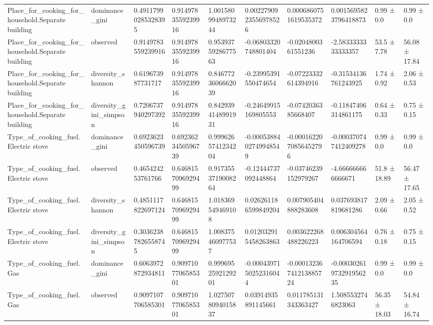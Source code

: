 \begin{longtable}{llllllllll}
Place\_for\_cooking\_for\_household.Separate building & dominance\_gini & 0.49117990285328395 & 0.9149783559239916 & 1.0015809948973244 & 0.0022790923556978526 & 0.0006860751619535372 & 0.0015695823796418873 & 0.99 ± 0.0 & 0.99 ± 0.0 \\
Place\_for\_cooking\_for\_household.Separate building & observed & 0.9149783559239916 & 0.9149783559239916 & 0.9539375928677563 & -0.06803320748801404 & -0.0204800361551236 & -2.5833333333333357 & 53.5 ± 7.78 & 56.08 ± 17.84 \\
Place\_for\_cooking\_for\_household.Separate building & diversity\_shannon & 0.619673987731717 & 0.9149783559239916 & 0.8467723606662039 & -0.23995391550474654 & -0.07223332614394916 & -0.31534136761243925 & 1.74 ± 0.92 & 2.06 ± 0.53 \\
Place\_for\_cooking\_for\_household.Separate building & diversity\_gini\_simpson & 0.7206737940297392 & 0.9149783559239916 & 0.8429394148991931 & -0.24649915169805553 & -0.0742036385668407 & -0.11847406314861175 & 0.64 ± 0.33 & 0.75 ± 0.15 \\
Type\_of\_cooking\_fuel.Electric stove & dominance\_gini & 0.6923623450596739 & 0.6923623450596739 & 0.9996265741234204 & -0.0005388402749948549 & -0.0001622070856452796 & -0.000370747412409278 & 0.99 ± 0.0 & 0.99 ± 0.0 \\
Type\_of\_cooking\_fuel.Electric stove & observed & 0.465424253761766 & 0.6468157096929499 & 0.9173553719008264 & -0.12444737092448864 & -0.03746239152979267 & -4.666666666666671 & 51.8 ± 18.89 & 56.47 ± 17.65 \\
Type\_of\_cooking\_fuel.Electric stove & diversity\_shannon & 0.4851117822697124 & 0.6468157096929499 & 1.018369549469108 & 0.026261186599849204 & 0.007905404888283608 & 0.037693817819681286 & 2.09 ± 0.66 & 2.05 ± 0.52 \\
Type\_of\_cooking\_fuel.Electric stove & diversity\_gini\_simpson & 0.30362387826558745 & 0.6468157096929499 & 1.008375460977537 & 0.012032915458263863 & 0.003622268488226223 & 0.006304564164706594 & 0.76 ± 0.18 & 0.75 ± 0.15 \\
Type\_of\_cooking\_fuel.Gas & dominance\_gini & 0.6063972872934811 & 0.9097107706585301 & 0.9996952592129201 & -0.0004397150252316044 & -0.00013236741213885724 & -0.00030261973291956235 & 0.99 ± 0.0 & 0.99 ± 0.0 \\
Type\_of\_cooking\_fuel.Gas & observed & 0.9097107706585301 & 0.9097107706585301 & 1.0275078094015837 & 0.03914935891145661 & 0.011785131343363427 & 1.5085532746823063 & 56.35 ± 18.03 & 54.84 ± 16.74 \\

\end{longtable}
